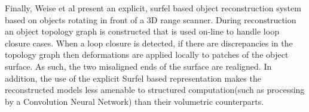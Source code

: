 Finally, Weise et al present an explicit, surfel based object reconstruction system\cite{Weise2009} based on objects rotating in front of a 3D 
range scanner. During reconstruction an object topology graph is constructed that is used on-line to handle loop closure cases. When a loop 
closure is detected, if there are discrepancies in the topology graph then deformations are applied locally to patches of the object surface. As 
such, the two misaligned ends of the surface are realigned. In addition, the use of the explicit Surfel based representation makes the reconstructed models less amenable to structured  computation(such as processing by a Convolution Neural Network) than their volumetric counterparts. 

